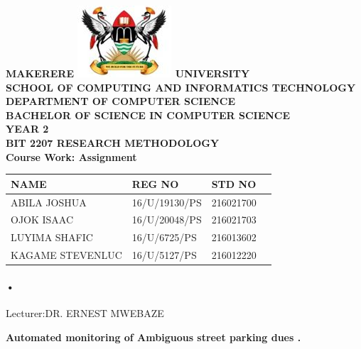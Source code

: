 \documentclass[12pt]{article}
\begin{document}
\begin{Huge}
\begin{center}
\begin{normalsize}
\textbf{MAKERERE \includegraphics[scale=0.5]{logo} UNIVERSITY }\\

\textbf{SCHOOL OF COMPUTING AND INFORMATICS TECHNOLOGY} \\
\textbf{DEPARTMENT OF COMPUTER SCIENCE} \\
\textbf{BACHELOR OF SCIENCE IN COMPUTER SCIENCE} \\
\textbf{YEAR 2} \\
\textbf{BIT 2207 RESEARCH METHODOLOGY} \\
\textbf{Course Work: Assignment }
\end{normalsize}
\end{center}
\end{Huge}

\begin{center}
\begin{tabular}{|l|l|l|c|}
\hline NAME  & REG NO & STD NO \\\hline
ABILA JOSHUA& 16/U/19130/PS & 216021700 \\\hline
OJOK ISAAC& 16/U/20048/PS& 216021703 \\\hline
LUYIMA SHAFIC& 16/U/6725/PS	 & 216013602 \\\hline
KAGAME STEVENLUC&16/U/5127/PS  & 216012220\\\hline

\end{tabular}

\paragraph{•}
Lecturer:DR. ERNEST MWEBAZE \\


\end{center}

\newpage

\begin{center}
\textbf{\sc Automated monitoring of Ambiguous  street parking dues .}\\
\end{center}
\end{document}
